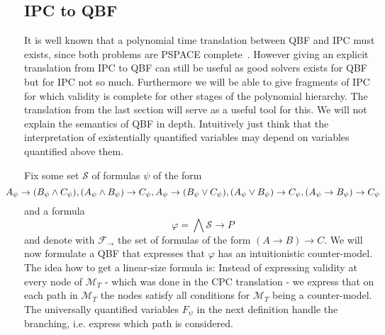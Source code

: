 \documentclass[a4paper,12pt]{report}
\theoremstyle{definition}
\theoremstyle{definition}
\theoremstyle{definition}
\theoremstyle{definition}
\theoremstyle{definition}
\theoremstyle{definition}
\theoremstyle{definition}
\begin{document}
	\subsection{IPC to QBF}
	
	It is well known that a polynomial time translation between QBF and IPC must exists, since both problems are PSPACE complete~\cite{garey1979computers, statman1979intuitionistic}. However giving an explicit translation from IPC to QBF can still be useful as good solvers exists for QBF but for IPC not so much. Furthermore we will be able to give fragments of IPC for which validity is complete for other stages of the polynomial hierarchy. The translation from the last section will serve as a useful tool for this. We will not explain the semantics of QBF in depth. Intuitively just think that the interpretation of existentially quantified variables may depend on variables quantified above them.
	
	 Fix some set $\mathcal S$ of formulas $\psi$ of the form $$\hspace*{-.7cm}A_\psi\to (B_\psi\wedge C_\psi), (A_\psi\wedge B_\psi)\to C_\psi, A_\psi\to (B_\psi\vee C_\psi), (A_\psi\vee B_\psi)\to C_\psi, (A_\psi\to B_\psi)\to C_\psi$$and a formula $$\varphi = \bigwedge \mathcal S\to P$$
	and denote with $\mathcal F_\to$ the set of formulas of the form $(A\to B)\to C$. We will now formulate a QBF that expresses that $\varphi$ has an intuitionistic counter-model. The idea how to get a linear-size formula is: Instead of expressing validity at every node of $\mathcal M_T$ - which was done in the CPC translation - we express that on each path in $\mathcal M_T$ the nodes satisfy all conditions for $\mathcal M_T$ being a counter-model. The universally quantified variables $F_\psi$ in the next definition handle the branching, i.e. express which path is considered.
	
\end{document}
